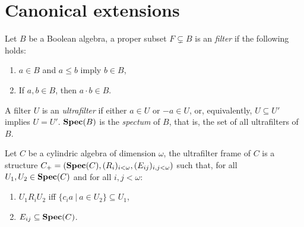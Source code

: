 \documentclass{article}
\theoremstyle{defin}
\newtheorem{definition}{Definition}
\theoremstyle{theorem}
\theoremstyle{claim}
\theoremstyle{prop}
\theoremstyle{lemma}
\theoremstyle{fact}
\theoremstyle{remark}
\theoremstyle{ex}
\theoremstyle{col}
\theoremstyle{question}
\begin{document}
\begin{comment}
We are interested in the special case of cylindric $\omega$-frames called Cartesian structure of dimension $\omega$. To be more precise:

\begin{definition}
TODO: Check that definition in \cite{goldblatt1995elementary}

Let $U$ be a set and $V \subseteq U^{\omega}$ be a non-empty subset of the full Cartesian space of dimension $\omega$, then an $\alpha$-dimension Cartesian structure generated by $V$ is an $\omega$-frame $\operatorname{S}(V) = (V, (R_{i})_{i < \omega}, (E_{ij})_{i, j < \omega})$ such that:
\begin{enumerate}
\item $R_i = \{ (w, v) \: | \: w, v \in V, w_k = w_k, k < \omega, i \neq k \}$
\item $E_{ij} = \{ w \in V \: | \: w_i = w_j \}$
\end{enumerate}
$\operatorname{S}(U^{\omega})$ is the full $\omega$-dimensional Cartesian structure. ${\bf Fct}_{\omega}$ is the class of all full $\omega$-dimensional Cartesian structures. Clearly ${\bf Fct}_{\omega} \subseteq \operatorname{Ca}_{\omega}$.
\end{definition}
\end{comment}

\section{Canonical extensions}

Let $B$ be a Boolean algebra, a proper subset $F \subsetneq B$ is an \emph{filter} if the following holds:
\begin{enumerate}
\item $a \in B$ and $a \leq b$ imply $b \in B$,
\item If $a, b \in B$, then $a \cdot b \in B$.
\end{enumerate}
A filter $U$ is an \emph{ultrafilter} if either $a \in U$ or $- a \in U$, or, equivalently, $U \subseteq U'$ implies $U = U'$. ${\bf Spec}(B)$ is the \emph{spectum} of $B$, that is, the set of all ultrafilters of $B$.

Let $C$ be a cylindric algebra of dimension $\omega$, the ultrafilter frame of $C$ is a structure $C_+ = ({\bf Spec}(C), (R_i)_{i < \omega}, (E_{ij})_{i, j < \omega})$ such that, for all $U_1, U_2 \in {\bf Spec}(C)$ and for all $i, j < \omega$:
\begin{enumerate}
\item $U_1 R_i U_2$ iff $\{ c_i a \: | \: a \in U_2 \} \subseteq U_1$,
\item $E_{ij} \subseteq {\bf Spec}(C)$.
\end{enumerate}
\end{document}
